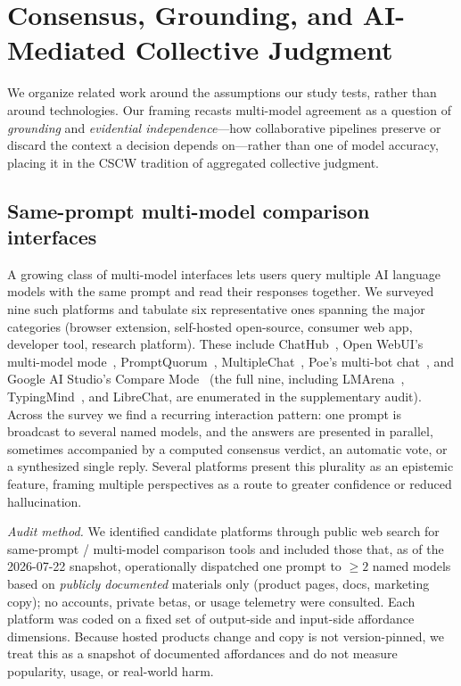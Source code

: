 \documentclass[acmsmall,screen,review,anonymous]{acmart}
\begin{document}
\section{Consensus, Grounding, and AI-Mediated Collective Judgment}
\label{sec:related}
We organize related work around the assumptions our study tests, rather than around technologies. Our framing
recasts multi-model agreement as a question of \emph{grounding} and \emph{evidential independence}---how
collaborative pipelines preserve or discard the context a decision depends on---rather than one of model
accuracy, placing it in the CSCW tradition of aggregated collective judgment.

\subsection{Same-prompt multi-model comparison interfaces}
\label{sec:interfaces}
A growing class of multi-model interfaces lets users query multiple AI language models with the same prompt
and read their responses together. We surveyed nine such platforms and tabulate six representative
ones spanning the major categories (browser extension, self-hosted open-source, consumer web app, developer
tool, research platform). These include
ChatHub~\cite{chathub2026}, Open WebUI's multi-model mode~\cite{openwebui2026multimodel},
PromptQuorum~\cite{promptquorum2026home,promptquorum2026blog}, MultipleChat~\cite{multiplechat2026},
Poe's multi-bot chat~\cite{poe2024multibot}, and Google AI Studio's Compare
Mode~\cite{googleaistudio2024compare} (the full nine, including LMArena~\cite{lmarena2026},
TypingMind~\cite{typingmind2026}, and LibreChat, are enumerated in the supplementary audit). Across the
survey we find a recurring interaction pattern: one prompt is broadcast to
several named models, and the answers are presented in parallel, sometimes accompanied by a computed
consensus verdict, an automatic vote, or a synthesized single reply. Several platforms present this
plurality as an epistemic feature, framing multiple perspectives as a route to greater confidence or reduced
hallucination.

\emph{Audit method.} We identified candidate platforms through public web search for same-prompt / multi-model
comparison tools and included those that, as of the 2026-07-22 snapshot, operationally dispatched one prompt to
$\ge 2$ named models based on \emph{publicly documented} materials only (product pages, docs, marketing copy);
no accounts, private betas, or usage telemetry were consulted. Each platform was coded on a fixed set of
output-side and input-side affordance dimensions. Because hosted products change and copy is not version-pinned,
we treat this as a snapshot of documented affordances and do not measure popularity, usage, or real-world harm.
\end{document}
